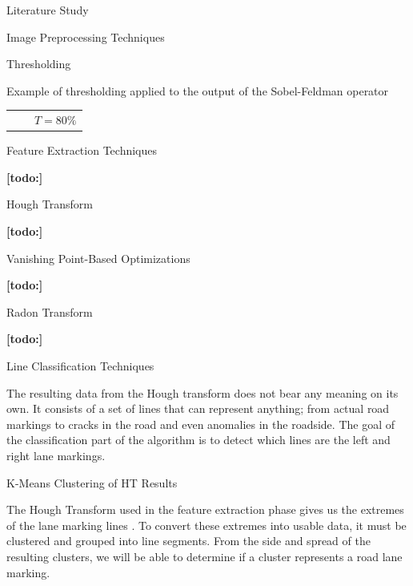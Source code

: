\documentclass{matthijs}
\begin{document}
\begin{hoofdstuk}{Literature Study}
\begin{paragraaf}{Image Preprocessing Techniques}
\begin{subparagraaf}{Thresholding}
\begin{figuur}{Example of thresholding applied to the output of the Sobel-Feldman operator}
\begin{tabular}{ccc}
															  	&& $ T = 80\% $
					\end{tabular}

				\end{figuur}

			\end{subparagraaf}

		\end{paragraaf}

		\begin{paragraaf}{Feature Extraction Techniques}

			\textbf{[todo:]}

			\begin{subparagraaf}{Hough Transform}

				\textbf{[todo:]}

				\begin{subsubparagraaf}{Vanishing Point-Based Optimizations}

					\textbf{[todo:]}

				\end{subsubparagraaf}

			\end{subparagraaf}

			\begin{subparagraaf}{Radon Transform}

				\textbf{[todo:]}

			\end{subparagraaf}
		\end{paragraaf}

		\begin{paragraaf}{Line Classification Techniques}

			The resulting data from the Hough transform does not bear any meaning on its own.
			It consists of a set of lines that can represent anything; from actual road markings to cracks in the road and even anomalies in the roadside.
			The goal of the classification part of the algorithm is to detect which lines are the left and right lane markings.

			\begin{subparagraaf}{K-Means Clustering of HT Results}

				The Hough Transform used in the feature extraction phase gives us the extremes of the lane marking lines \cite{gupta2016automated}.
				To convert these extremes into usable data, it must be clustered and grouped into line segments.
				From the side and spread of the resulting clusters, we will be able to determine if a cluster represents a road lane marking.


\end{subparagraaf}
\end{paragraaf}
\end{hoofdstuk}
\end{document}

